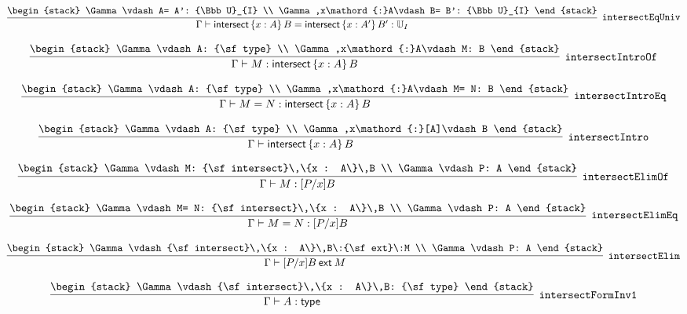 \[
\infer[{\tt intersectEqUniv}]{\Gamma \vdash {\sf intersect}\,\{x : A\}\,B= {\sf intersect}\,\{x : A'\}\,B': {\Bbb U}_{I}}{
\begin{stack}
\Gamma \vdash A= A': {\Bbb U}_{I}
\\
\Gamma ,x\mathord{:}A\vdash B= B': {\Bbb U}_{I}
\end{stack}}
\]

\[
\infer[{\tt intersectIntroOf}]{\Gamma \vdash M: {\sf intersect}\,\{x : A\}\,B}{
\begin{stack}
\Gamma \vdash A: {\sf type}
\\
\Gamma ,x\mathord{:}A\vdash M: B
\end{stack}}
\]

\[
\infer[{\tt intersectIntroEq}]{\Gamma \vdash M= N: {\sf intersect}\,\{x : A\}\,B}{
\begin{stack}
\Gamma \vdash A: {\sf type}
\\
\Gamma ,x\mathord{:}A\vdash M= N: B
\end{stack}}
\]

\[
\infer[{\tt intersectIntro}]{\Gamma \vdash {\sf intersect}\,\{x : A\}\,B}{
\begin{stack}
\Gamma \vdash A: {\sf type}
\\
\Gamma ,x\mathord{:}[A]\vdash B
\end{stack}}
\]

\[
\infer[{\tt intersectElimOf}]{\Gamma \vdash M: [P/x]B}{
\begin{stack}
\Gamma \vdash M: {\sf intersect}\,\{x : A\}\,B
\\
\Gamma \vdash P: A
\end{stack}}
\]

\[
\infer[{\tt intersectElimEq}]{\Gamma \vdash M= N: [P/x]B}{
\begin{stack}
\Gamma \vdash M= N: {\sf intersect}\,\{x : A\}\,B
\\
\Gamma \vdash P: A
\end{stack}}
\]

\[
\infer[{\tt intersectElim}]{\Gamma \vdash [P/x]B\:{\sf ext}\:M}{
\begin{stack}
\Gamma \vdash {\sf intersect}\,\{x : A\}\,B\:{\sf ext}\:M
\\
\Gamma \vdash P: A
\end{stack}}
\]

\[
\infer[{\tt intersectFormInv1}]{\Gamma \vdash A: {\sf type}}{
\begin{stack}
\Gamma \vdash {\sf intersect}\,\{x : A\}\,B: {\sf type}
\end{stack}}
\]

